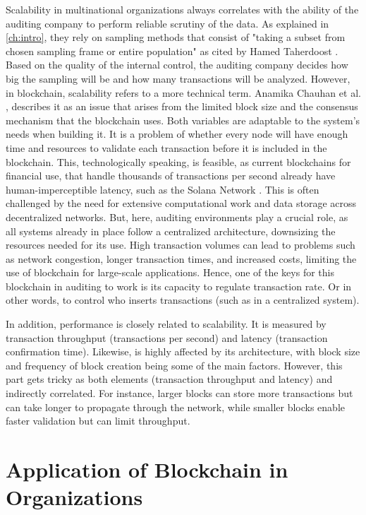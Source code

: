 Scalability in multinational organizations always correlates with the ability of the auditing company to perform reliable scrutiny of the data. As explained in \cref{ch:intro}, they rely on sampling methods that consist of "taking a subset from chosen sampling frame or entire population" as cited by Hamed Taherdoost \cite{samplingDefinition}. Based on the quality of the internal control, the auditing company decides how big the sampling will be and how many transactions will be analyzed. However, in blockchain, scalability refers to a more technical term. Anamika Chauhan et al. \cite{scalability}, describes it as an issue that arises from the limited block size and the consensus mechanism that the blockchain uses. Both variables are adaptable to the system's needs when building it. It is a problem of whether every node will have enough time and resources to validate each transaction before it is included in the blockchain. This, technologically speaking, is feasible, as current blockchains for financial use, that handle thousands of transactions per second already have human-imperceptible latency, such as the Solana Network \cite{solana}. This is often challenged by the need for extensive computational work and data storage across decentralized networks. But, here, auditing environments play a crucial role, as all systems already in place follow a centralized architecture, downsizing the resources needed for its use. High transaction volumes can lead to problems such as network congestion, longer transaction times, and increased costs, limiting the use of blockchain for large-scale applications. Hence, one of the keys for this blockchain in auditing to work is its capacity to regulate transaction rate. Or in other words, to control who inserts transactions (such as in a centralized system). 

In addition, performance is closely related to scalability. It is measured by transaction throughput (transactions per second) and latency (transaction confirmation time). Likewise, is highly affected by its architecture, with block size and frequency of block creation being some of the main factors. However, this part gets tricky as both elements (transaction throughput and latency) and indirectly correlated. For instance, larger blocks can store more transactions but can take longer to propagate through the network, while smaller blocks enable faster validation but can limit throughput.



\section{Application of Blockchain in Organizations}

